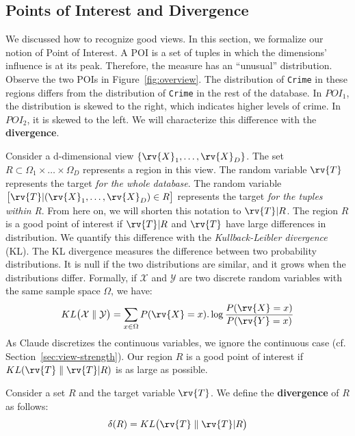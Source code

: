 \subsection{Points of Interest and Divergence}

We discussed how to recognize good views. In this section, we formalize our
notion of Point of Interest. A POI is a set of tuples in which the dimensions'
influence is at its peak. Therefore, the measure has an ``unusual''
distribution. Observe the two POIs in Figure~\ref{fig:overview}.  The
distribution of \texttt{Crime} in these regions differs from the distribution
of \texttt{Crime} in the rest of the database.  In $POI_1$, the distribution is
skewed to the right, which indicates higher levels of crime. In $POI_2$, it is
skewed to the left. We will characterize this difference with the
\textbf{divergence}.

Consider a d-dimensional view $\{\rv{X}_1, \ldots, \rv{X}_D\}$. The set
$R\subset \Omega_1 \times \ldots \times \Omega_D$ represents a region in this
view.  The random variable $\rv{T}$ represents the target \emph{for the whole
database}.  The random variable $\big[ \rv{T} | (\rv{X}_1, \ldots, \rv{X}_D) \in R
\big] $ represents the target \emph{for the tuples within R}. From here on, we
will shorten this notation to $\rv{T} | R$. The region $R$ is a good point
of interest if $\rv{T} |R $ and $\rv{T}$ have large differences in
distribution.  We quantify this difference with the \emph{Kullback-Leibler
divergence} (KL).  The KL divergence measures the difference between two
probability distributions. It is null if the two distributions are similar, and
it grows when the distributions differ.  Formally, if $\mathcal{X}$ and
$\mathcal{Y}$ are two discrete random variables with the same sample space
$\Omega$, we have:
\begin{equation}\label{eq:KL_disc} 
    KL\big( \mathcal{X} \parallel \mathcal{Y} \big) = 
    \sum_{x\in \Omega} P(\rv{X} = x).\log{\frac{P(\rv{X} = x)}{P(\rv{Y} = x)}} 
\end{equation}
As Claude discretizes the continuous variables, we ignore the continuous case
(cf.  Section~\ref{sec:view-strength}). Our region $R$ is a good point of
interest if $KL ( \rv{T} \parallel \rv{T} |R )$ is as large as possible.
\begin{definition}
    Consider a set $R$ and the target variable $\rv{T}$. We define the
    \textbf{divergence} of $R$ as follows: 
\begin{equation}\label{eq:divergence}
    \delta(R) = KL \big( \rv{T} \parallel \rv{T} |R \big)
\end{equation}
\end{definition}

